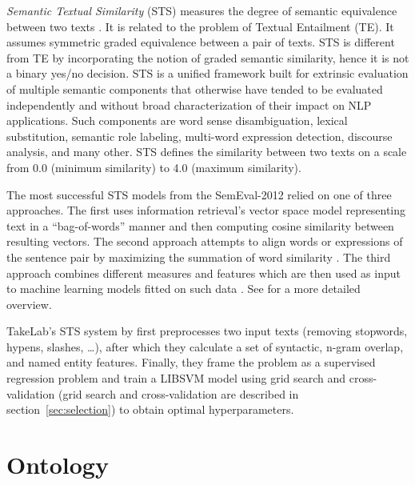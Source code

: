 \textit{Semantic  Textual  Similarity} (STS) measures the  degree  of  semantic
equivalence  between two texts \citep{agirre2012semeval}. It is related to the problem
of Textual Entailment (TE). It assumes symmetric graded equivalence between
a pair of texts. STS is different from TE by incorporating the notion of 
graded semantic similarity, hence it is not a binary yes/no decision. 
STS is a unified framework built for 
extrinsic evaluation of multiple semantic components that otherwise
have tended to be evaluated independently  and  without  broad
characterization  of their impact on NLP applications. 
Such components are word  sense  disambiguation, lexical  substitution,  semantic
role  labeling,  multi-word  expression  detection, discourse analysis, and 
many other. STS defines the similarity between two texts on a scale from 
0.0 (minimum similarity) to 4.0 (maximum similarity).

The most successful STS models from the SemEval-2012 relied on 
one of three approaches. The first uses information retrieval's 
vector space model \citep{meadow1992text} representing text in a 
``bag-of-words'' manner and then computing cosine similarity between 
resulting vectors. The second approach attempts to align words or expressions of
the sentence pair by maximizing the summation of word similarity \citep{mihalcea2006corpus}.
The third approach combines different measures and features which are then 
used as input to machine learning models fitted on such data 
\citep{vsaric2012takelab}. See \citep{han2013umbc_ebiquity}
for a more detailed overview. 

TakeLab's STS system by \citet{vsaric2012takelab} first preprocesses two input
texts (removing stopwords, hypens, slashes, \dots), after which they calculate
a set of syntactic, n-gram overlap, and named entity features.  Finally, they
frame the problem as a supervised regression problem and train a LIBSVM model
\citep{chang2011libsvm} using grid search and cross-validation (grid search and
cross-validation are described in
section~\ref{sec:selection}) to obtain optimal hyperparameters.

\section{Ontology}
\label{sec:knowledge_representation}

